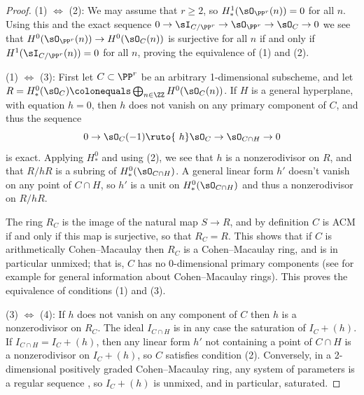 \begin{proof}
\def\sl#1{(#1)}
\let\rTo\to
\let\Leftrightarrow\iff
{\sl 1} $\Leftrightarrow$ {\sl 2}: We may assume that $r\geq 2$, so $H^1_*(\sO_{\PP^r}(n)) = 0$ for all $n$. Using this and the exact sequence
$
0\rTo \sI_{C/\PP^r}  \rTo  \sO_{\PP^r}  \rTo  \sO_C  \rTo  0
$
we see that $H^0(\sO_{\PP^r}(n)) \to H^0(\sO_C(n))$ is surjective for all $n$ if and only if $H^1(\sI_{C/\PP^r}(n)) = 0$ for all $n$,
proving the equivalence of {\sl 1} and {\sl 2.}

{\sl 1} $\Leftrightarrow$ {\sl 3}: First let $C\subset \PP^r$ be an arbitrary 1-dimensional subscheme,
and let $R =H^0_*(\sO_{C}) \colonequals \bigoplus_{n\in \ZZ} H^0(\sO_{C}(n))$.
If $H$ is a
general hyperplane, with equation $h=0$, then $h$ does not vanish on any primary component of $C$, and thus the sequence
$$
0\rTo \sO_C(-1) \ruto{\ h}\sO_C\rTo \sO_{C\cap H}\rTo 0
$$
is exact. Applying $H^0_*$ and using
(2),
we see that $h$ is a nonzerodivisor on $R$, and that $R/hR$ is
a subring of $H^0_*(\sO_{C\cap H})$.  A general linear form $h'$ doesn't vanish on
any point of $C\cap H$, so $h'$ is a unit on $H^0_*(\sO_{C\cap H})$
and thus a nonzerodivisor on $R/hR$.

The ring $R_C$ is the image of the natural map $S\to R$, and by definition $C$ is ACM if and only if this map is surjective,
so that $R_C = R.$ This shows that if $C$ is arithmetically Cohen--Macaulay then $R_C$ is a Cohen--Macaulay ring,
and is in particular unmixed; that is, $C$ has no 0-dimensional primary components (see for example \cite[Chapter 18]{Eisenbud1995} for general
information about Cohen--Macaulay rings). This proves the equivalence of conditions {\sl 1} and {\sl 3.}


{\sl 3} $\Leftrightarrow$ {\sl 4}: If  $h$ does not vanish on any component of $C$ then $h$ is a nonzerodivisor on $R_C$. The ideal $I_{C\cap H}$ is in any case the saturation of $I_C+(h)$.
If $I_{C\cap H}=I_C+(h)$, then any linear form $h'$ not containing a point of $C\cap H$ is a nonzerodivisor
on $I_C+(h)$, so $C$ satisfies condition {\sl 2}. Conversely, in a 2-dimensional positively graded Cohen--Macaulay ring, any
system of parameters is a regular sequence \cite[Section 18.2]{Eisenbud1995}, so $I_C+(h)$ is unmixed, and in particular, saturated.
\end{proof}

